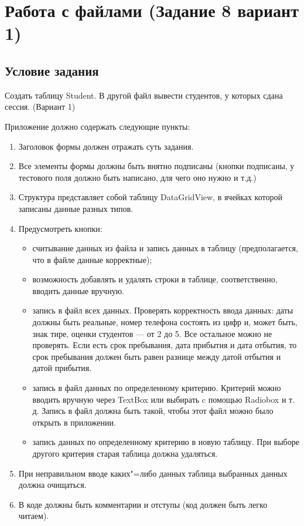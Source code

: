 \section{Работа с файлами (Задание 8 вариант 1)}

\subsection{Условие задания}

Создать таблицу Student. В другой файл вывести студентов, у которых сдана сессия. (Вариант 1)

Приложение должно содержать следующие пункты:

\begin{enumerate}
    \item{Заголовок формы должен отражать суть задания.}

    \item{Все элементы формы должны быть внятно подписаны (кнопки подписаны, у тестового поля должно быть написано, для чего оно нужно и т.д.)}
    \item{Структура представляет собой таблицу DataGridView, в ячейках которой записаны данные разных типов.}
    \item {Предусмотреть кнопки:
        \begin{itemize}
            \item{считывание данных из файла и запись данных в таблицу (предполагается, что в файле данные корректные);}
            \item{возможность добавлять и удалять строки в таблице, соответственно, вводить данные вручную.}
            \item{запись в файл всех данных. Проверять корректность ввода данных: даты должны быть реальные, номер телефона состоять из цифр и, может быть, знак тире, оценки студентов --- от 2 до 5. Все остальное можно не проверять. Если есть срок пребывания, дата прибытия и дата отбытия, то срок пребывания должен быть равен разнице между датой отбытия и датой прибытия.}
            \item{запись в файл данных по определенному критерию. Критерий можно вводить вручную через TextBox или выбирать c помощью Radiobox и т. д. Запись в файл должна быть такой, чтобы этот файл можно было открыть в приложении.}
            \item{запись данных по определенному критерию в новую таблицу. При выборе другого критерия старая таблица должна удаляться.}
\end{itemize}
}
\item{При неправильном вводе каких"=либо данных таблица выбранных данных должна очищаться.}
    \item{В коде должны быть комментарии и отступы (код должен быть легко читаем).}
\end{enumerate}

